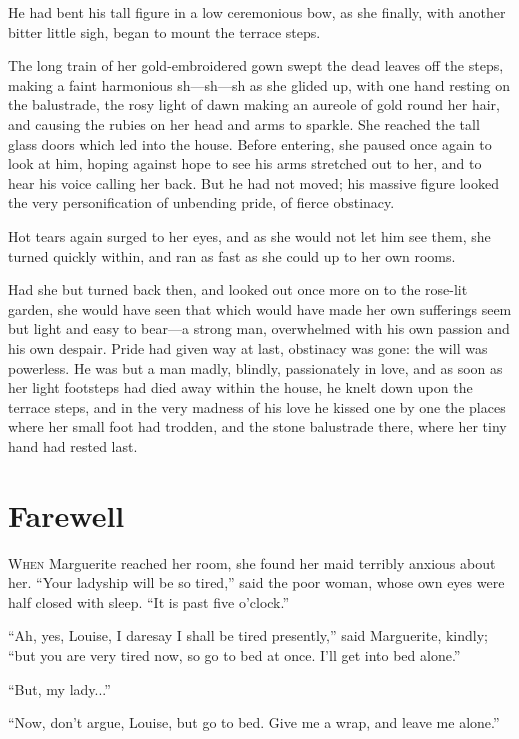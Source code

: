 \documentclass[paper=5.5in:8.5in,BCOR=7mm,twoside,DIV=calc,12pt,usegeometry,chapterprefix,endperiod,headings=big]{scrbook}
\begin{document}
He had bent his tall figure in a low ceremonious bow, as she finally, with another bitter little sigh, began to mount the terrace steps.

The long train of her gold-embroidered gown swept the dead leaves off the steps, making a faint harmonious sh---sh---sh as she glided up, with one hand resting on the balustrade, the rosy light of dawn making an aureole of gold round her hair, and causing the rubies on her head and arms to sparkle. She reached the tall glass doors which led into the house. Before entering, she paused once again to look at him, hoping against hope to see his arms stretched out to her, and to hear his voice calling her back. But he had not moved; his massive figure looked the very personification of unbending pride, of fierce obstinacy.

Hot tears again surged to her eyes, and as she would not let him see them, she turned quickly within, and ran as fast as she could up to her own rooms.

Had she but turned back then, and looked out once more on to the rose-lit garden, she would have seen that which would have made her own sufferings seem but light and easy to bear---a strong man, overwhelmed with his own passion and his own despair. Pride had given way at last, obstinacy was gone: the will was powerless. He was but a man madly, blindly, passionately in love, and as soon as her light footsteps had died away within the house, he knelt down upon the terrace steps, and in the very madness of his love he kissed one by one the places where her small foot had trodden, and the stone balustrade there, where her tiny hand had rested last.

\chapter{Farewell}
\lettrine[lines=4]{W}{hen} Marguerite reached her room, she found her maid terribly anxious about her. \enquote{Your ladyship will be so tired,} said the poor woman, whose own eyes were half closed with sleep. \enquote{It is past five o'clock.}

\enquote{Ah, yes, Louise, I daresay I shall be tired presently,} said Marguerite, kindly; \enquote{but you are very tired now, so go to bed at once. I'll get into bed alone.}

\enquote{But, my lady...}

\enquote{Now, don't argue, Louise, but go to bed. Give me a wrap, and leave me alone.}
\end{document}
